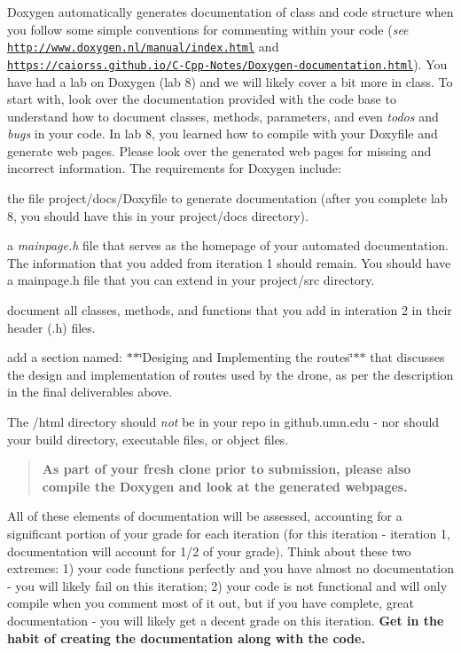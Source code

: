 Doxygen automatically generates documentation of class and code structure when you follow some simple conventions for commenting within your code ({\itshape see} \href{http://www.doxygen.nl/manual/index.html}{\tt http\+://www.\+doxygen.\+nl/manual/index.\+html} and \href{https://caiorss.github.io/C-Cpp-Notes/Doxygen-documentation.html}{\tt https\+://caiorss.\+github.\+io/\+C-\/\+Cpp-\/\+Notes/\+Doxygen-\/documentation.\+html}). You have had a lab on Doxygen (lab 8) and we will likely cover a bit more in class. To start with, look over the documentation provided with the code base to understand how to document classes, methods, parameters, and even {\itshape todo\textquotesingle{}s} and {\itshape bugs} in your code. In lab 8, you learned how to compile with your Doxyfile and generate web pages. Please look over the generated web pages for missing and incorrect information. The requirements for Doxygen include\+:


\begin{DoxyItemize}
\item the file {\ttfamily project/docs/\+Doxyfile} to generate documentation (after you complete lab 8, you should have this in your {\ttfamily project/docs} directory).
\item a {\itshape mainpage.\+h} file that serves as the homepage of your automated documentation. The information that you added from iteration 1 should remain. You should have a mainpage.\+h file that you can extend in your {\ttfamily project/src} directory.
\item document all classes, methods, and functions that you add in interation 2 in their header (.h) files.
\item add a section named\+: $\ast$$\ast$\char`\"{}\+Desiging and Implementing the routes\char`\"{}$\ast$$\ast$ that discusses the design and implementation of routes used by the drone, as per the description in the final deliverables above.
\item The /html directory should {\itshape not} be in your repo in github.\+umn.\+edu -\/ nor should your build directory, executable files, or object files.
\end{DoxyItemize}

\begin{quote}
{\bfseries As part of your fresh clone prior to submission, please also compile the Doxygen and look at the generated webpages.} \end{quote}


All of these elements of documentation will be assessed, accounting for a significant portion of your grade for each iteration (for this iteration -\/ iteration 1, documentation will account for 1/2 of your grade). Think about these two extremes\+: 1) your code functions perfectly and you have almost no documentation -\/ you will likely fail on this iteration; 2) your code is not functional and will only compile when you comment most of it out, but if you have complete, great documentation -\/ you will likely get a decent grade on this iteration. {\bfseries Get in the habit of creating the documentation along with the code.}





